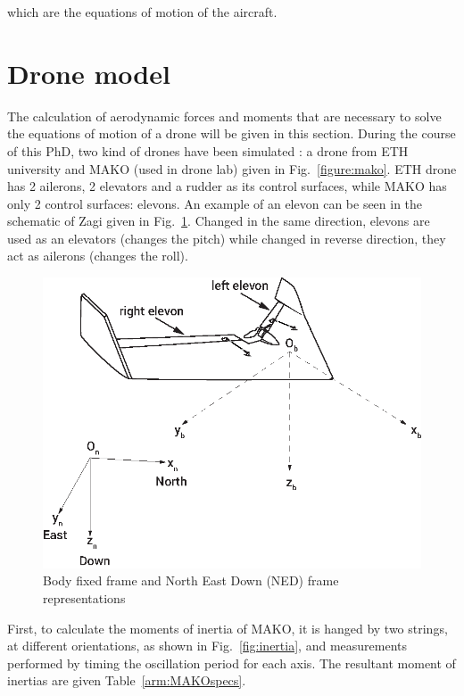 which are the equations of motion of the aircraft. 

\section{Drone model}

The calculation of aerodynamic forces and moments that are necessary to solve the equations of motion of a drone will be given in this section. 
During the course of this PhD, two kind of drones have been simulated : a drone from ETH university \cite{ducard2009fault} and MAKO (used in drone lab) given in Fig.~\ref{figure:mako}. 
ETH drone has 2 ailerons, 2 elevators and a rudder as its control surfaces, while MAKO has only 2 control surfaces: elevons. 
An example of an elevon can be seen in the schematic of Zagi given in Fig.~\ref{fig:bodyNEDframes}. 
Changed in the same direction, elevons are used as an elevators (changes the pitch) while changed in reverse direction, they act as ailerons (changes the roll). 

\begin{figure}
\begin{center}
\includegraphics[width=13cm]{figures/ZagiElevon}    %
\caption{Body fixed frame and North East Down (NED) frame representations} 
\label{fig:bodyNEDframes}
\end{center}
\end{figure}

First, to calculate the moments of inertia of MAKO, it is hanged by two strings, at different orientations, as shown in Fig.~\ref{fig:inertia}, and measurements performed by timing the oscillation period for each axis. 
The resultant moment of inertias are given Table~\ref{arm:MAKOspecs}. 

